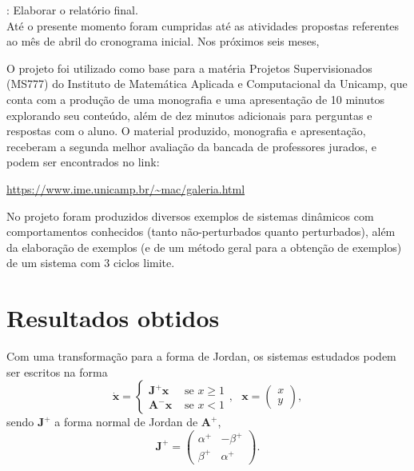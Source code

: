 \documentclass[12pt]{article}
\begin{document}
: Elaborar o relatório final.\\

Até o presente momento foram cumpridas até as atividades propostas  referentes ao mês de abril do cronograma inicial. Nos próximos seis meses, 


O projeto foi utilizado como base para a matéria Projetos Supervisionados (MS777) do Instituto de Matemática Aplicada e Computacional  da Unicamp, que conta com a produção de uma monografia e uma apresentação de 10 minutos explorando seu conteúdo, além de dez minutos adicionais para perguntas e respostas com o aluno. O material produzido, monografia e apresentação, receberam a segunda melhor avaliação da bancada de professores jurados, e podem ser encontrados no link:

\begin{center}\url{https://www.ime.unicamp.br/~mac/galeria.html}\end{center}

No projeto foram produzidos diversos exemplos de sistemas dinâmicos com comportamentos conhecidos (tanto não-perturbados quanto  perturbados), além da elaboração de exemplos (e de um método geral para a obtenção de exemplos) de um sistema com 3 ciclos limite.

\section*{Resultados obtidos}


Com uma transformação para a forma de Jordan, os sistemas estudados podem ser escritos na forma
\begin{equation}
\label{eqn:jor}
\dot{\mathbf{x}}=\left\{\begin{array}{ll}
\mathbf{J}^{+} \mathbf{x} & \text { se } x \geq 1 \\
\mathbf{A}^{-} \mathbf{x} & \text { se } x<1
\end{array},\text{ }\mathbf{x}=\begin{pmatrix}
x\\
y
\end{pmatrix}\right.,
\end{equation}
sendo $\mathbf{J}^{+}$ a forma normal de Jordan de $\mathbf{A}^{+}$,
\[
\mathbf{J}^{+}=\left(\begin{array}{cc}
\alpha^{+} & -\beta^{+} \\
\beta^{+} & \alpha^{+}
\end{array}\right).
\]
\end{document}
